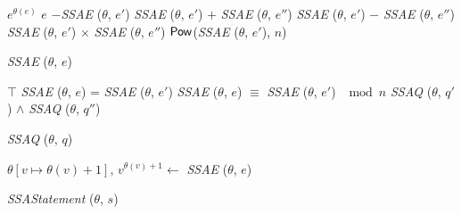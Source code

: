 
\begin{algorithm}
  \begin{algorithmic}[1]
       \Return $e^{\theta(e)}$ \EndCase
       \Return $e$ \EndCase
       \Return $-$\textit{SSAE} ($\theta$, $e'$) \EndCase
        \Return \textit{SSAE} ($\theta$, $e'$) $+$ 
                \textit{SSAE} ($\theta$, $e''$)
      \EndCase
        \Return \textit{SSAE} ($\theta$, $e'$) $-$ 
                \textit{SSAE} ($\theta$, $e''$)
      \EndCase
        \Return \textit{SSAE} ($\theta$, $e'$) $\times$ 
                \textit{SSAE} ($\theta$, $e''$)
      \EndCase
        \Return $\mbox{\textsf{Pow}}$(\textit{SSAE} ($\theta$, $e'$), $n$)
      \EndCase
    \EndMatch
  \end{algorithmic}
  \caption{\textit{SSAE} ($\theta$, $e$)}
\end{algorithm}

\begin{algorithm}
  \begin{algorithmic}[1]
      \Case{$\top$} \Return $\top$ \EndCase
        \Return \textit{SSAE} ($\theta$, $e$) = \textit{SSAE} ($\theta$, $e'$)
      \EndCase
        \Return \textit{SSAE} ($\theta$, $e$) $\equiv$ 
                \textit{SSAE} ($\theta$, $e'$) $\mod n$
      \EndCase
        \Return \textit{SSAQ} ($\theta$, $q'$) $\wedge$
                \textit{SSAQ} ($\theta$, $q''$)
      \EndCase
    \EndMatch
  \end{algorithmic}
  \caption{\textit{SSAQ} ($\theta$, $q$)}
\end{algorithm}

\begin{algorithm}
  \begin{algorithmic}[1]
        \Return $\theta[v \mapsto \theta(v) + 1]$, 
                $v^{\theta(v) + 1} \leftarrow$ \textit{SSAE} ($\theta$, $e$)
      \EndCase
      \EndCase
    \EndMatch
  \end{algorithmic}
  \caption{\textit{SSAStatement} ($\theta$, $s$)}
\end{algorithm}

